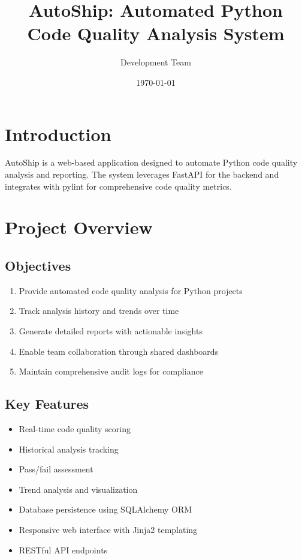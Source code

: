 \documentclass[12pt]{article}
\title{AutoShip: Automated Python Code Quality Analysis System}
\author{Development Team}
\date{\today}
\begin{document}
\maketitle

\tableofcontents

\newpage

\section{Introduction}

AutoShip is a web-based application designed to automate Python code quality analysis and reporting. The system leverages FastAPI for the backend and integrates with pylint for comprehensive code quality metrics.

\section{Project Overview}

\subsection{Objectives}

\begin{enumerate}
    \item Provide automated code quality analysis for Python projects
    \item Track analysis history and trends over time
    \item Generate detailed reports with actionable insights
    \item Enable team collaboration through shared dashboards
    \item Maintain comprehensive audit logs for compliance
\end{enumerate}

\subsection{Key Features}

\begin{itemize}
    \item Real-time code quality scoring
    \item Historical analysis tracking
    \item Pass/fail assessment
    \item Trend analysis and visualization
    \item Database persistence using SQLAlchemy ORM
    \item Responsive web interface with Jinja2 templating
    \item RESTful API endpoints
\end{itemize}
\end{document}
